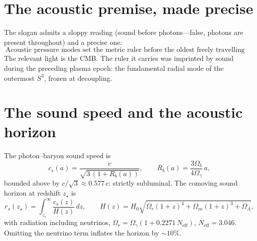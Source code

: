 \documentclass[11pt]{article}
\theoremstyle{remark}
\begin{document}
\section{The acoustic premise, made precise}
The slogan admits a sloppy reading (sound before photons---false, photons are present throughout) and a precise one:
\begin{equation}
\boxed{\ \text{Acoustic pressure modes set the metric ruler before the oldest freely travelling light was released.}\ }
\end{equation}
The relevant light is the CMB. The ruler it carries was imprinted by sound during the preceding plasma epoch: the fundamental radial mode of the outermost $S^3$, frozen at decoupling.
\section{The sound speed and the acoustic horizon}
The photon--baryon sound speed is
\begin{equation}
c_s(a) = \frac{c}{\sqrt{3\,(1 + R_b(a))}}, \qquad R_b(a) = \frac{3\Omega_b}{4\Omega_\gamma}\,a,
\label{eq:cs}
\end{equation}
bounded above by $c/\sqrt3 \approx 0.577\,c$: strictly subluminal. The comoving sound horizon at redshift $z_\star$ is
\begin{equation}
r_s(z_\star) = \int_{z_\star}^{\infty} \frac{c_s(z)}{H(z)}\,dz,
\qquad
H(z) = H_0\sqrt{\Omega_r(1+z)^4 + \Omega_m(1+z)^3 + \Omega_\Lambda},
\label{eq:rs}
\end{equation}
with radiation including neutrinos, $\Omega_r = \Omega_\gamma(1 + 0.2271\,N_{\mathrm{eff}})$, $N_{\mathrm{eff}} = 3.046$. Omitting the neutrino term inflates the horizon by $\sim 10\%$.
\end{document}
